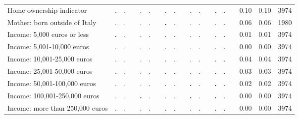 \begin{tabular}{l c c c c c c c c c c c c c c c c c c}
Home ownership indicator &         . &         . & &         . &         . & &         . &         . & &         . &         . & & \textbf{        .} &         . & &      0.10 &      0.10 &      3974 \\
Mother: born outside of Italy &         . &         . & &         . &         . & & \textbf{        .} &         . & &         . &         . & &         . &         . & &      0.06 &      0.06 &      1980 \\
Income: 5,000 euros or less & \textbf{        .} &         . & &         . &         . & &         . &         . & &         . &         . & &         . &         . & &      0.01 &      0.01 &      3974 \\
Income: 5,001-10,000 euros &         . &         . & &         . &         . & &         . &         . & &         . &         . & &         . &         . & &      0.00 &      0.00 &      3974 \\
Income: 10,001-25,000 euros &         . &         . & &         . &         . & &         . &         . & &         . &         . & &         . &         . & &      0.04 &      0.04 &      3974 \\
Income: 25,001-50,000 euros &         . &         . & &         . &         . & &         . &         . & &         . &         . & &         . &         . & &      0.03 &      0.03 &      3974 \\
Income: 50,001-100,000 euros &         . &         . & &         . &         . & &         . &         . & & \textbf{        .} &         . & & \textbf{        .} &         . & &      0.02 &      0.02 &      3974 \\
Income: 100,001-250,000 euros &         . &         . & & \textbf{        .} &         . & &         . &         . & & \textbf{        .} &         . & & \textbf{        .} &         . & &      0.00 &      0.00 &      3974 \\
Income: more than 250,000 euros &         . &         . & &         . &         . & &         . &         . & &         . &         . & &         . &         . & &      0.00 &      0.00 &      3974 \\
\bottomrule
\end{tabular}
